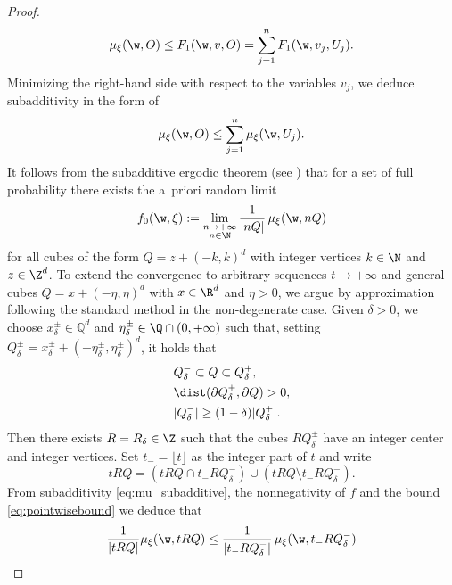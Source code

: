 \begin{proof}
\begin{equation*}
\mu_{\xi}(\w,O)\leq F_1(\w,v,O)=\sum_{j=1}^n F_1(\w,v_j,U_j).
\end{equation*}
Minimizing the right-hand side with respect to the variables $v_j$, we deduce subadditivity in the form of
\begin{equation}\label{eq:mu_subadditive}
\mu_{\xi}(\w,O)\leq \sum_{j=1}^n\mu_{\xi}(\w,U_j).
\end{equation}
It follows from the subadditive ergodic theorem (see \cite[Th.\,2.7]{AkKr}) that for a set of full probability there exists the a~priori random limit
\begin{equation}\label{eq:integer_convergence}
f_{0}(\w,\xi):=\lim_{\substack{n\to +\infty\\ n\in\N}}\frac{1}{|nQ|}\,\mu_{\xi}(\w,nQ)
\end{equation}
for all cubes of the form $Q=z+(-k,k)^d$ with integer vertices $k\in\N$ and $z\in\nobreak\Z^d$. To extend the convergence to arbitrary sequences $t\to +\infty$ and general cubes $Q=x+(-\eta,\eta)^d$ with $x\in\R^d$ and $\eta>0$, we argue by approximation following the standard method in the non-degenerate case. Given $\delta>0$, we choose $x^{\pm}_{\delta}\in\mathbb{Q}^d$ and $\eta^{\pm}_{\delta}\in\Q\cap(0,+\infty)$ such that, setting $Q^{\pm}_{\delta}=x^{\pm}_{\delta}+(-\eta^{\pm}_{\delta},\eta^{\pm}_{\delta})^d$, it holds that
\begin{equation}\label{eq:cube_preparation}
\begin{split}
&Q^{-}_{\delta}\subset Q\subset Q^+_{\delta},
\\
&\dist(\partial Q_{\delta}^{\pm},\partial Q)>0,
\\
&|Q^-_{\delta}|\geq (1-\delta)|Q^+_{\delta}|.
\end{split}
\end{equation}
Then there exists $R=R_{\delta}\in\Z$ such that the cubes $RQ^{\pm}_{\delta}$ have an integer center and integer vertices. Set $t_-=\lfloor t\rfloor$ as the integer part of $t$ and write
\begin{equation*}
tRQ= (tRQ\cap t_-RQ_{\delta}^-)\cup (tRQ\setminus t_-RQ^-_{\delta}).
\end{equation*}
From subadditivity \eqref{eq:mu_subadditive}, the nonnegativity of $f$ and the bound \eqref{eq:pointwisebound} we deduce that
\begin{multline}\label{eq:fromintegertoall}
\frac{1}{|tRQ|}\mu_{\xi}(\w,tRQ)\leq \frac{1}{|t_-RQ_{\delta}^-|}\,\mu_{\xi}(\w,t_-RQ_{\delta}^-)
\\

\end{multline}
\end{proof}
